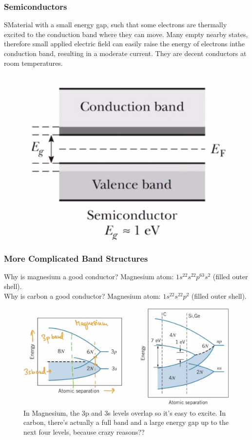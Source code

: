 \documentclass[class=article,crop=false]{standalone}
\begin{document}
\subsubsection{Semiconductors}

SMaterial with a small energy gap, such that some electrons are thermally excited to the conduction band where they can move. Many empty nearby states, therefore small applied electric field can easily raise the energy of electrons inthe conduction band, resulting in a moderate current. They are decent conductors at room temperatures.

\begin{figure}[h!]
	\centering
	\includegraphics[width=.8\linewidth]{./Images/semiconductor_band.png}
	\caption{}
\end{figure}

\subsubsection{More Complicated Band Structures}

Why is magnesium a good conductor? Magnesium atom: $1s^22s^22p^63s^2$ (filled outer shell). \\
Why is carbon a good conductor? Magnesium atom: $1s^22s^22p^2$ (filled outer shell).

\begin{figure}[h!]
	\centering
	\includegraphics[width=.8\linewidth]{./Images/complicated_band.png}
	\caption{In Magnesium, the 3p and 3s levels overlap so it's easy to excite. In carbon, there's actually a full band and a large energy gap up to the next four levels, because crazy reasons??}
\end{figure}
\end{document}
